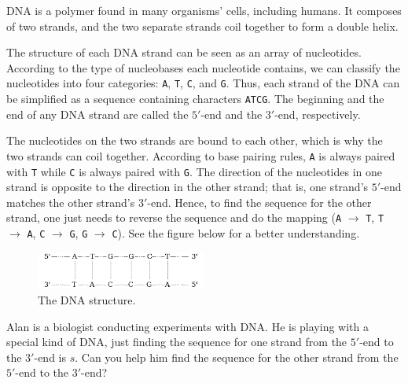 DNA is a polymer found in many organisms' cells, including humans.
It composes of two strands, and the two separate strands coil together to form a double helix.

The structure of each DNA strand can be seen as an array of nucleotides.
According to the type of nucleobases each nucleotide contains, we can classify the nucleotides into four categories: \texttt{A}, \texttt{T}, \texttt{C}, and \texttt{G}.
Thus, each strand of the DNA can be simplified as a sequence containing characters \texttt{ATCG}.
The beginning and the end of any DNA strand are called the $5'$-end and the $3'$-end, respectively.

The nucleotides on the two strands are bound to each other, which is why the two strands can coil together.
According to base pairing rules, \texttt{A} is always paired with \texttt{T} while \texttt{C} is always paired with \texttt{G}.
The direction of the nucleotides in one strand is opposite to the direction in the other strand;
that is, one strand's $5'$-end matches the other strand's $3'$-end.
Hence, to find the sequence for the other strand, one just needs to reverse the sequence and do the mapping
(\texttt{A} $\to$ \texttt{T}, \texttt{T} $\to$ \texttt{A}, \texttt{C} $\to$ \texttt{G}, \texttt{G} $\to$ \texttt{C}).
See the figure below for a better understanding.

\begin{figure}[h]
\center
\includegraphics[width=0.5\textwidth]{image/dna.png}
\caption{The DNA structure.}
\end{figure}
    

Alan is a biologist conducting experiments with DNA.
He is playing with a special kind of DNA, just finding the sequence for one strand from the $5'$-end to the $3'$-end is $s$.
Can you help him find the sequence for the other strand from the $5'$-end to the $3'$-end? 